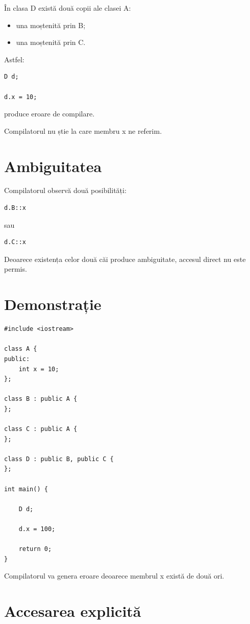 \documentclass[12pt,a4paper]{article}
\begin{document}
În clasa D există două copii ale clasei A:

\begin{itemize}
\item una moștenită prin B;
\item una moștenită prin C.
\end{itemize}

Astfel:

\begin{verbatim}
D d;

d.x = 10;
\end{verbatim}

produce eroare de compilare.

Compilatorul nu știe la care membru x ne referim.

\section{Ambiguitatea}

Compilatorul observă două posibilități:

\begin{verbatim}
d.B::x
\end{verbatim}

sau

\begin{verbatim}
d.C::x
\end{verbatim}

Deoarece existența celor două căi produce ambiguitate, accesul direct nu este permis.

\section{Demonstrație}

\begin{verbatim}
#include <iostream>

class A {
public:
    int x = 10;
};

class B : public A {
};

class C : public A {
};

class D : public B, public C {
};

int main() {

    D d;

    d.x = 100;

    return 0;
}
\end{verbatim}

Compilatorul va genera eroare deoarece membrul x există de două ori.

\section{Accesarea explicită}
\end{document}
